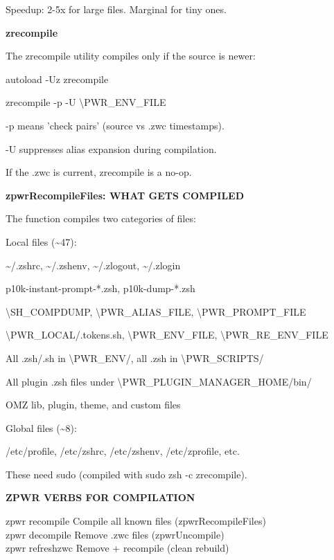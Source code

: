\documentclass[11pt,a4paper,twoside]{book}
\begin{document}
Speedup: 2-5x for large files. Marginal for tiny ones.


\vspace{12pt}
{\bfseries\color{neonyellow} zrecompile}\vspace{4pt}

The zrecompile utility compiles only if the source is newer:

autoload -Uz zrecompile

zrecompile -p -U \textbackslash{}PWR\_ENV\_FILE

-p means 'check pairs' (source vs .zwc timestamps).

-U suppresses alias expansion during compilation.

If the .zwc is current, zrecompile is a no-op.


\vspace{12pt}
{\bfseries\color{neonyellow} zpwrRecompileFiles: WHAT GETS COMPILED}\vspace{4pt}

The function compiles two categories of files:

Local files (\textasciitilde{}47):

\textasciitilde{}/.zshrc, \textasciitilde{}/.zshenv, \textasciitilde{}/.zlogout, \textasciitilde{}/.zlogin

p10k-instant-prompt-*.zsh, p10k-dump-*.zsh

\textbackslash{}SH\_COMPDUMP, \textbackslash{}PWR\_ALIAS\_FILE, \textbackslash{}PWR\_PROMPT\_FILE

\textbackslash{}PWR\_LOCAL/.tokens.sh, \textbackslash{}PWR\_ENV\_FILE, \textbackslash{}PWR\_RE\_ENV\_FILE

All .zsh/.sh in \textbackslash{}PWR\_ENV/, all .zsh in \textbackslash{}PWR\_SCRIPTS/

All plugin .zsh files under \textbackslash{}PWR\_PLUGIN\_MANAGER\_HOME/bin/

OMZ lib, plugin, theme, and custom files

Global files (\textasciitilde{}8):

/etc/profile, /etc/zshrc, /etc/zshenv, /etc/zprofile, etc.

These need sudo (compiled with sudo zsh -c zrecompile).


\vspace{12pt}
{\bfseries\color{neonyellow} ZPWR VERBS FOR COMPILATION}\vspace{4pt}

\begin{codebox}
zpwr recompile       Compile all known files (zpwrRecompileFiles)\\
zpwr decompile       Remove .zwc files (zpwrUncompile)\\
zpwr refreshzwc      Remove + recompile (clean rebuild)\\
\end{codebox}
\end{document}
